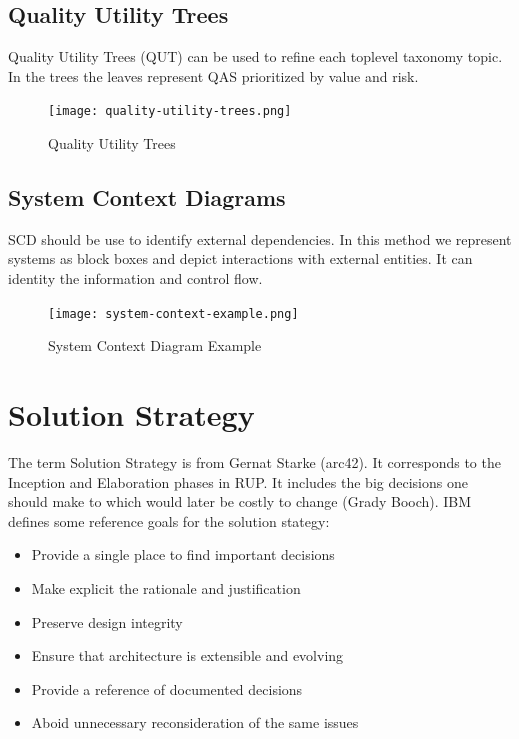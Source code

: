 \documentclass[../Main.tex]{subfiles}
\begin{document}
\newpage
\subsection{Quality Utility Trees}
Quality Utility Trees (QUT) can be used to refine
each toplevel taxonomy topic. In the trees the leaves
represent QAS prioritized by value and risk.

\begin{figure}[H]
    \centering
    \texttt{[image: quality-utility-trees.png]}
    \caption{Quality Utility Trees}
\end{figure}
\newpage

\subsection{System Context Diagrams}
SCD should be use to identify external dependencies.
In this method we represent systems as block boxes and
depict interactions with external entities.
It can identity the information and control flow.

\begin{figure}[H]
    \centering
    \texttt{[image: system-context-example.png]}
    \caption{System Context Diagram Example}
\end{figure}


\section{Solution Strategy}
The term Solution Strategy is from Gernat Starke (arc42).
It corresponds to the Inception and Elaboration phases in
RUP. It includes the big decisions
one should make to which would later be costly to change (Grady Booch).
IBM defines some reference goals for the solution stategy:
\begin{itemize}
    \item Provide a single place to find important decisions
    \item Make explicit the rationale and justification
    \item Preserve design integrity
    \item Ensure that architecture is extensible and evolving
    \item Provide a reference of documented decisions
    \item Aboid unnecessary reconsideration of the same issues
\end{itemize}
\end{document}
